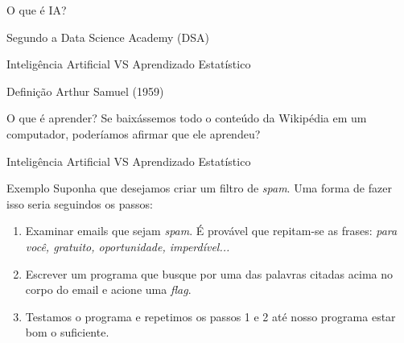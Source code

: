 \begin{frame}{O que é IA?}
	\begin{block}{Segundo a Data Science Academy (DSA)}
		\justifying
	\end{block}
\end{frame}

\begin{frame}{Inteligência Artificial VS Aprendizado Estatístico}
	\begin{block}{Definição}
		\justifying
		Arthur Samuel (1959)
	\end{block}
	\pause
	\begin{block}{O que é aprender?}
		Se baixássemos todo o conteúdo da Wikipédia em um computador, poderíamos afirmar que ele aprendeu?
	\end{block}
\end{frame}

\begin{frame}{Inteligência Artificial VS Aprendizado Estatístico}
	\begin{block}{Exemplo}
		\justifying
		Suponha que desejamos criar um filtro de \textit{spam}.
		Uma forma de fazer isso seria seguindos os passos:
		\pause
		\begin{enumerate}
			\justifying
			\item Examinar emails que sejam \textit{spam}.
			\pause
			É provável que repitam-se as frases: \textit{para você, gratuito, oportunidade, imperdível...}
			\pause
			\item Escrever um programa que busque por uma das palavras citadas acima no corpo do email e acione uma \textit{flag}.
			\pause
			\item Testamos o programa e repetimos os passos 1 e 2 até nosso programa estar bom o suficiente. 
		\end{enumerate}
	\end{block}
\end{frame}

